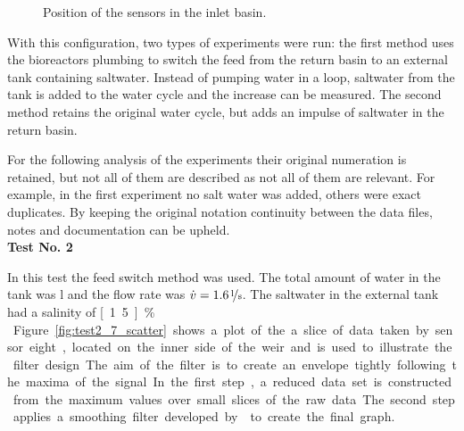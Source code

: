 \begin{figure}[H]
\begin{center}
		\caption{Position of the sensors in the inlet basin. \parencite{ts}}
		\label{fig:senspos}
	\end{center}
\end{figure}

With this configuration, two types of experiments were run: the first method uses the bioreactors plumbing to switch the feed from the return basin to an external tank containing saltwater. Instead of pumping water in a loop, saltwater from the tank is added to the water cycle and the increase can be measured. The second method retains the original water cycle, but adds an impulse of saltwater in the return basin.

For the following analysis of the experiments their original numeration is retained, but not all of them are described as not all of them are relevant. For example, in the first experiment no salt water was added, others were exact duplicates. By keeping the original notation continuity between the data files, notes and documentation can be upheld.\\

\textbf{Test No. 2}

In this test the feed switch method was used. The total amount of water in the tank was \unit[65]{l} and the flow rate was $\dot{v} =  \unitfrac[1.6]{l}{s}$. The saltwater in the external tank had a salinity of \unit[1.5]{\%}.\\

Figure \ref{fig:test2_7_scatter} shows a plot of the a slice of data taken by sensor eight, located on the inner side of the weir and is used to illustrate the filter design. The aim of the filter is to create an envelope tightly following the maxima of the signal. In the first step, a reduced data set is constructed from the maximum values over small slices of the raw data. The second step applies a smoothing filter developed by \textcite{savitzky1964smoothing} to create the final graph.

